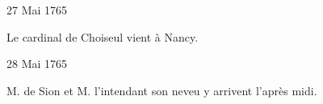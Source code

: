                      
                     \begin{diary}{27 Mai 1765}{}
                        
                        
                           Le cardinal de Choiseul vient à
                              Nancy. \bigskip
        
        
                     \end{diary}
                     \begin{diary}{28 Mai 1765}{}
                        
                        
                           M. de Sion et M. l'intendant son neveu
                           y arrivent l'après midi. \bigskip
        
        
                     \end{diary}
